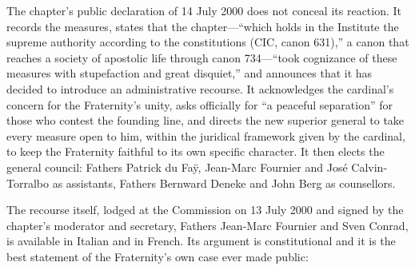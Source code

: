 The chapter's public declaration of 14 July 2000 does not conceal its
reaction. It records the measures, states that the chapter---``which holds
in the Institute the supreme authority according to the constitutions
(CIC, canon 631),'' a canon that reaches a society of apostolic life
through canon 734---``took cognizance of these measures with stupefaction
and great disquiet,'' and announces that it has decided to introduce an
administrative recourse. It acknowledges the cardinal's concern for the
Fraternity's unity, asks officially for ``a peaceful separation'' for
those who contest the founding line, and directs the new superior general
to take every measure open to him, within the juridical framework given by
the cardinal, to keep the Fraternity faithful to its own specific
character. It then elects the general council: Fathers Patrick du Faÿ,
Jean-Marc Fournier and José Calvin-Torralbo as assistants, Fathers
Bernward Deneke and John Berg as
counsellors.

The recourse itself, lodged at the Commission on 13 July 2000 and signed
by the chapter's moderator and secretary, Fathers Jean-Marc Fournier and
Sven Conrad, is available in Italian and in French. Its argument is
constitutional and it is the best statement of the Fraternity's own case
ever made public:

